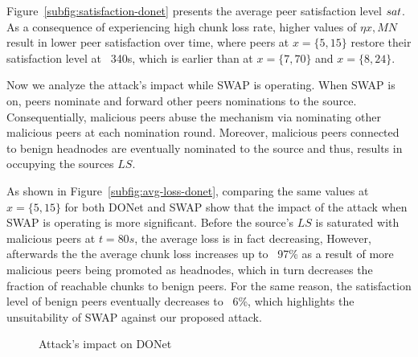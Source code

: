Figure~\ref{subfig:satisfaction-donet} presents the average peer satisfaction level $sat$.
As a consequence of experiencing high chunk loss rate, higher values of $\eta x, MN$ result in lower peer satisfaction over time, where peers at $x=\{5, 15\}$ restore their satisfaction level at ~340s, which is earlier than at $x=\{7, 70\}$ and $x=\{8, 24\}$.

Now we analyze the attack's impact while SWAP is operating.
When SWAP is on, peers nominate and forward other peers nominations to the source. 
Consequentially, malicious peers abuse the mechanism via nominating other malicious peers at each nomination round. 
Moreover, malicious peers connected to benign headnodes are eventually nominated to the source and thus, results in occupying the sources $LS$.

As shown in Figure~\ref{subfig:avg-loss-donet}, comparing the same values at $x=\{5, 15\}$ for both DONet and SWAP show that the impact of the attack when SWAP is operating is more significant.
Before the source's $LS$ is saturated with malicious peers at $t=80s$, the average loss is in fact decreasing, However, afterwards the the average chunk loss increases up to ~97\% as a result of more malicious peers being promoted as headnodes, which in turn decreases the fraction of reachable chunks to benign peers.
For the same reason, the satisfaction level of benign peers eventually decreases to ~6\%, which highlights the unsuitability of SWAP against our proposed attack.

\begin{figure}[t!]
\centering

  \mbox{}
   \vspace{-1.5mm}
  \mbox{}

  \caption{Attack's impact on DONet}
  \vspace{-3.5mm}
  \label{fig:attack-results}
  \end{figure}


